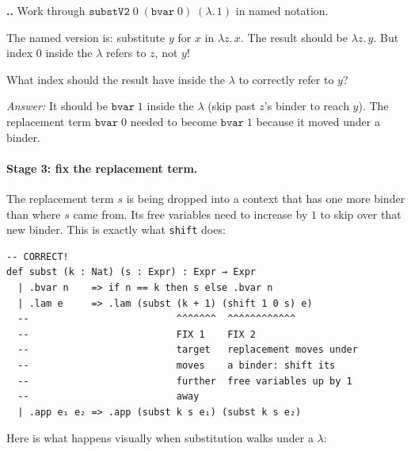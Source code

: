 \documentclass[11pt,a4paper]{article}
\newcounter{exercise}[section]
\renewcommand{\theexercise}{\thesection.\arabic{exercise}}
\theoremstyle{definition}
\newcommand{\lam}{\lambda}
\begin{document}
\begin{exercisebox}
\textbf{\theexercise.}\; Work through $\texttt{substV2}\;0\;(\texttt{bvar}\;0)\;(\lam.\, 1)$ in named notation.

The named version is: substitute $y$ for $x$ in $\lam z.\, x$. The result should be $\lam z.\, y$. But index $0$ inside the $\lam$ refers to $z$, not $y$!

What index should the result have inside the $\lam$ to correctly refer to $y$?

\emph{Answer:} It should be $\texttt{bvar}\;1$ inside the $\lam$ (skip past $z$'s binder to reach $y$). The replacement term $\texttt{bvar}\;0$ needed to become $\texttt{bvar}\;1$ because it moved under a binder.
\end{exercisebox}

\paragraph{Stage 3: fix the replacement term.}

The replacement term $s$ is being dropped into a context that has one more
binder than where $s$ came from. Its free variables need to increase by $1$
to skip over that new binder. This is exactly what \texttt{shift} does:

\begin{verbatim}
-- CORRECT!
def subst (k : Nat) (s : Expr) : Expr → Expr
  | .bvar n    => if n == k then s else .bvar n
  | .lam e     => .lam (subst (k + 1) (shift 1 0 s) e)
  --                          ^^^^^^^  ^^^^^^^^^^^^
  --                          FIX 1    FIX 2
  --                          target   replacement moves under
  --                          moves    a binder: shift its
  --                          further  free variables up by 1
  --                          away
  | .app e₁ e₂ => .app (subst k s e₁) (subst k s e₂)
\end{verbatim}

Here is what happens visually when substitution walks under a $\lam$:
\end{document}
